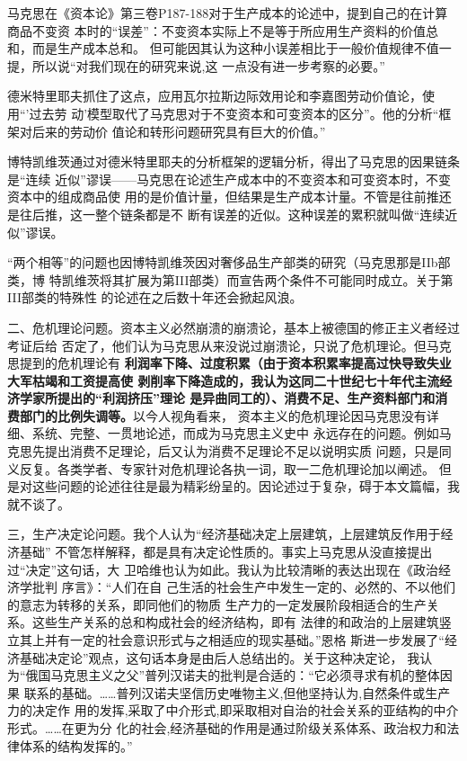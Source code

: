 马克思在《资本论》第三卷P187-188对于生产成本的论述中，提到自己的在计算商品不变资
本时的“误差”：不变资本实际上不是等于所应用生产资料的价值总和，而是生产成本总和。
但可能因其认为这种小误差相比于一般价值规律不值一提，所以说“对我们现在的研究来说,这
一点没有进一步考察的必要。”

德米特里耶夫抓住了这点，应用瓦尔拉斯边际效用论和李嘉图劳动价值论，使用“'过去劳
动'模型取代了马克思对于不变资本和可变资本的区分”。他的分析“框架对后来的劳动价
值论和转形问题研究具有巨大的价值。”

博特凯维茨通过对德米特里耶夫的分析框架的逻辑分析，得出了马克思的因果链条是“连续
近似”谬误——马克思在论述生产成本中的不变资本和可变资本时，不变资本中的组成商品使
用的是价值计量，但结果是生产成本计量。不管是往前推还是往后推，这一整个链条都是不
断有误差的近似。这种误差的累积就叫做“连续近似”谬误。

“两个相等”的问题也因博特凯维茨因对奢侈品生产部类的研究（马克思那是IIb部类，博
特凯维茨将其扩展为第III部类）而宣告两个条件不可能同时成立。关于第III部类的特殊性
的论述在之后数十年还会掀起风浪。

二、危机理论问题。资本主义必然崩溃的崩溃论，基本上被德国的修正主义者经过考证后给
否定了，他们认为马克思从来没说过崩溃论，只说了危机理论。但马克思提到的危机理论有
\textbf{利润率下降、过度积累（由于资本积累率提高过快导致失业大军枯竭和工资提高使
剥削率下降造成的，我认为这同二十世纪七十年代主流经济学家所提出的“利润挤压”理论
是异曲同工的）、消费不足、生产资料部门和消费部门的比例失调等。}以今人视角看来，
资本主义的危机理论因马克思没有详细、系统、完整、一贯地论述，而成为马克思主义史中
永远存在的问题。例如马克思先提出消费不足理论，后又认为消费不足理论不足以说明实质
问题，只是同义反复。各类学者、专家针对危机理论各执一词，取一二危机理论加以阐述。
但是对这些问题的论述往往是最为精彩纷呈的。因论述过于复杂，碍于本文篇幅，我就不谈了。

三，生产决定论问题。我个人认为“经济基础决定上层建筑，上层建筑反作用于经济基础”
不管怎样解释，都是具有决定论性质的。事实上马克思从没直接提出过“决定”这句话，大
卫哈维也认为如此。我认为比较清晰的表达出现在《政治经济学批判 序言》：“人们在自
己生活的社会生产中发生一定的、必然的、不以他们的意志为转移的关系，即同他们的物质
生产力的一定发展阶段相适合的生产关系。这些生产关系的总和构成社会的经济结构，即有
法律的和政治的上层建筑竖立其上并有一定的社会意识形式与之相适应的现实基础。”恩格
斯进一步发展了“经济基础决定论”观点，这句话本身是由后人总结出的。关于这种决定论，
我认为“俄国马克思主义之父”普列汉诺夫的批判是合适的：“它必须寻求有机的整体因果
联系的基础。……普列汉诺夫坚信历史唯物主义,但他坚持认为,自然条件或生产力的决定作
用的发挥,采取了中介形式,即采取相对自治的社会关系的亚结构的中介形式。……在更为分
化的社会,经济基础的作用是通过阶级关系体系、政治权力和法律体系的结构发挥的。”


